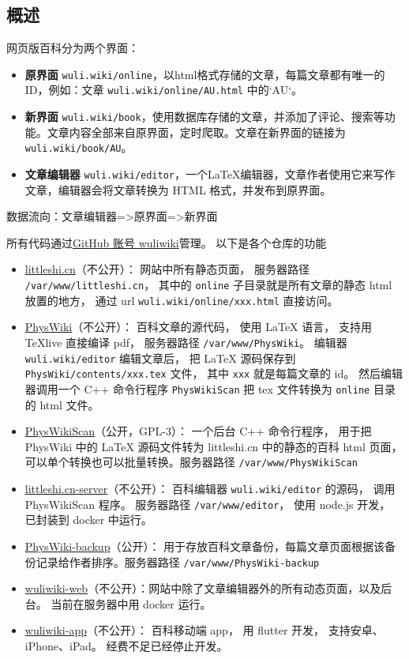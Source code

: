 
\subsection{概述}
网页版百科分为两个界面：
\begin{itemize}
\item \textbf{原界面} \verb`wuli.wiki/online`，以html格式存储的文章，每篇文章都有唯一的ID，例如：文章 \verb`wuli.wiki/online/AU.html` 中的`AU`。 
\item \textbf{新界面} \verb`wuli.wiki/book`，使用数据库存储的文章，并添加了评论、搜索等功能。文章内容全部来自原界面，定时爬取。文章在新界面的链接为 \verb`wuli.wiki/book/AU`。
\item \textbf{文章编辑器} \verb`wuli.wiki/editor`，一个LaTeX编辑器，文章作者使用它来写作文章，编辑器会将文章转换为 HTML 格式，并发布到原界面。
\end{itemize}
数据流向：文章编辑器=>原界面=>新界面

所有代码通过\href{https://github.com/wuliwiki}{GitHub 账号 wuliwiki}管理。 以下是各个仓库的功能
\begin{itemize}
\item \href{https://github.com/MacroUniverse/littleshi.cn}{littleshi.cn}（不公开）： 网站中所有静态页面， 服务器路径 \verb`/var/www/littleshi.cn`， 其中的 \verb`online` 子目录就是所有文章的静态 html 放置的地方， 通过 url \verb`wuli.wiki/online/xxx.html` 直接访问。
\item \href{https://github.com/MacroUniverse/PhysWiki}{PhysWiki}（不公开）： 百科文章的源代码， 使用 LaTeX 语言， 支持用 TeXlive 直接编译 pdf， 服务器路径 \verb`/var/www/PhysWiki`。 编辑器 \verb`wuli.wiki/editor` 编辑文章后， 把 LaTeX 源码保存到 \verb`PhysWiki/contents/xxx.tex` 文件， 其中 \verb`xxx` 就是每篇文章的 id。 然后编辑器调用一个 C++ 命令行程序 \verb`PhysWikiScan` 把 tex 文件转换为 \verb`online` 目录的 html 文件。
\item \href{https://github.com/MacroUniverse/PhysWikiScan}{PhysWikiScan}（公开，GPL-3）： 一个后台 C++ 命令行程序， 用于把 PhysWiki 中的 LaTeX 源码文件转为 littleshi.cn 中的静态的百科 html 页面， 可以单个转换也可以批量转换。服务器路径 \verb`/var/www/PhysWikiScan`
\item \href{https://github.com/MacroUniverse/littleshi.cn-server}{littleshi.cn-server}（不公开）： 百科编辑器 \verb`wuli.wiki/editor` 的源码， 调用 PhysWikiScan 程序。 服务器路径 \verb`/var/www/editor`， 使用 node.js 开发， 已封装到 docker 中运行。
\item \href{https://github.com/MacroUniverse/PhysWiki-backup}{PhysWiki-backup}（公开）： 用于存放百科文章备份，每篇文章页面根据该备份记录给作者排序。服务器路径 \verb`/var/www/PhysWiki-backup`
\item \href{https://github.com/MacroUniverse/wuliwiki-web}{wuliwiki-web}（不公开）：网站中除了文章编辑器外的所有动态页面，以及后台。 当前在服务器中用 docker 运行。
\item \href{https://github.com/MacroUniverse/wuliwiki-app}{wuliwiki-app}（不公开）： 百科移动端 app， 用 flutter 开发， 支持安卓、iPhone、iPad。 经费不足已经停止开发。
\end{itemize}

